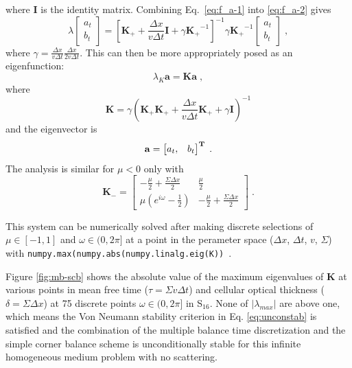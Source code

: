 where $\bm{I}$ is the identity matrix. Combining Eq.~\eqref{eq:f_a-1} into \eqref{eq:f_a-2} gives
\begin{equation}
    \lambda
    \begin{bmatrix}
        a_t \\b_t
    \end{bmatrix}
    = \left[ \bm{K_{+}} + \frac{\Delta x}{v\Delta t} \bm{I} + \gamma\bm{K_{+}}^{-1} \right]^{-1} \gamma \bm{K_{+}}^{-1}
    \begin{bmatrix}
        a_t \\ b_t
    \end{bmatrix} \; ,
\end{equation}
where $\gamma = \frac{\Delta x}{v\Delta t}  \frac{\Delta x}{2v\Delta t}$.
This can then be more appropriately posed as an eigenfunction:
\begin{equation}
    \lambda_K
    \bm{a}
    = \bm{K} \bm{a}\;,
\end{equation}
where
\begin{equation}
    \bm{K} = \gamma \left( \bm{K_{+}}\bm{K_{+}} + \frac{\Delta x}{v \Delta t}\bm{K_{+}} + \gamma \bm{I}\right)^{-1}
\end{equation}
and the eigenvector is
\begin{equation}
    \bf{a} = \begin{bmatrix}
        a_t, & b_t
    \end{bmatrix} ^T \;.
\end{equation}
The analysis is similar for $\mu<0$ only with
\begin{equation}
    \bm{K_{-}} = \begin{bmatrix}
        -\frac{\mu}{2} + \frac{\Sigma\Delta x}{2} & \frac{\mu}{2} \\
        \mu \left ( e^{i\omega} - \frac{1}{2} \right) & -\frac{\mu}{2} + \frac{\Sigma\Delta x}{2} 
    \end{bmatrix} \;.
\end{equation}

This system can be numerically solved after making discrete selections of $\mu \in [-1, 1]$ and $\omega \in (0,2\pi]$ at a point in the perameter space ($\Delta x$, $\Delta t$, $v$, $\Sigma$) with \texttt{numpy.max(numpy.abs(numpy.linalg.eig(K))}~\cite{harris2020array}.

Figure \ref{fig:mb-scb} shows the absolute value of the maximum eigenvalues of $\bm{K}$ at various points in mean free time ($\tau=\Sigma v\Delta t$) and cellular optical thickness ($\delta=\Sigma\Delta x$) at 75 discrete points $\omega \in (0,2\pi]$ in S$_{16}$.
None of $|\lambda_{max}|$ are above one, which means the Von Neumann stability criterion in Eq. \eqref{eq:unconstab} is satisfied and the combination of the multiple balance time discretization and the simple corner balance scheme is unconditionally stable for this infinite homogeneous medium problem with no scattering.

